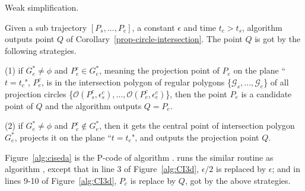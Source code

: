 \textcolor[rgb]{1.00,0.00,0.00}{Weak simplification.}
%

Given a sub trajectory $[P_s,...,P_e]$, a constant $\epsilon$ and time $t_c > t_s$, algorithm \cista outputs point $Q$ of Corollary~\ref{prop-circle-intersection}. The point $Q$ is got by the following strategies.

(1) if $G^*_e \ne \phi$ and $P^c_e \in G^*_e$, meaning the projection point of $P_e$ on the plane ``$t=t_c$", \ie $P^c_e$, is in the intersection polygon of regular polygons \{$\mathcal{G}_s, \dots, \mathcal{G}_e$\} of all projection circles \{$\mathcal{O}(P^c_s, \epsilon^c_s), \ldots, \mathcal{O}(P^c_e, \epsilon^c_e)$\}, then the point $P_e$ is a candidate point of $Q$ and the algorithm outputs $Q=P_e$.

(2) if $G^*_e \ne \phi$ and $P^c_e \notin G^*_e$, then it gets the central point of intersection polygon $G^*_e$, projects it on the plane ``$t=t_e$", and outputs the projection point $Q$.

Figure~\ref{alg:ciseda} is the P-code of algorithm \cista. \cista runs the similar routine as algorithm \cist, except that in line 3 of Figure~\ref{alg:CI3d}, $\epsilon/2$ is replaced by $\epsilon$; and in lines 9-10 of Figure~\ref{alg:CI3d}, $P_e$ is replace by $Q$, got by the above strategies.


